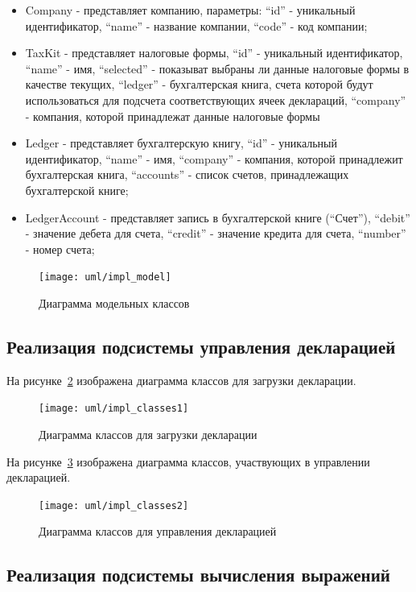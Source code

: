 \documentclass[14pt,a4paper]{reportmod}
\begin{document}
\begin{itemize}
  \item Company - представляет компанию, параметры: ``id'' - уникальный идентификатор, ``name'' - название компании, ``code'' - код компании;
  \item TaxKit - представляет налоговые формы, ``id'' - уникальный идентификатор, ``name'' - имя, ``selected'' - показыват выбраны ли данные налоговые формы в качестве текущих, ``ledger'' - бухгалтерская книга, счета которой будут использоваться для подсчета соответствующих ячеек деклараций, ``company'' - компания, которой принадлежат данные налоговые формы
  \item Ledger - представляет бухгалтерскую книгу, ``id'' - уникальный идентификатор, ``name'' - имя, ``company'' - компания, которой принадлежит бухгалтерская книга, ``accounts'' - список счетов, принадлежащих бухгалтерской книге;
  \item LedgerAccount - представляет запись в бухгалтерской книге (``Счет''), ``debit'' - значение дебета для счета, ``credit'' - значение кредита для счета, ``number'' - номер счета;
\end{itemize}

\begin{figure}
  \centering
  \texttt{[image: uml/impl\_model]}
  \caption{Диаграмма модельных классов}
  \label{pic:model_classes}
\end{figure}

\subsection{Реализация подсистемы управления декларацией}

На рисунке~\ref{pic:loadclasses} изображена диаграмма классов для загрузки декларации.

\begin{figure}
  \centering
  \texttt{[image: uml/impl\_classes1]}
  \caption{Диаграмма классов для загрузки декларации}
  \label{pic:loadclasses}
\end{figure}

На рисунке~\ref{pic:reportmanager} изображена диаграмма классов, участвующих в управлении декларацией.

\begin{figure}
  \centering
  \texttt{[image: uml/impl\_classes2]}
  \caption{Диаграмма классов для управления декларацией}
  \label{pic:reportmanager}
\end{figure}

\subsection{Реализация подсистемы вычисления выражений}
\end{document}

